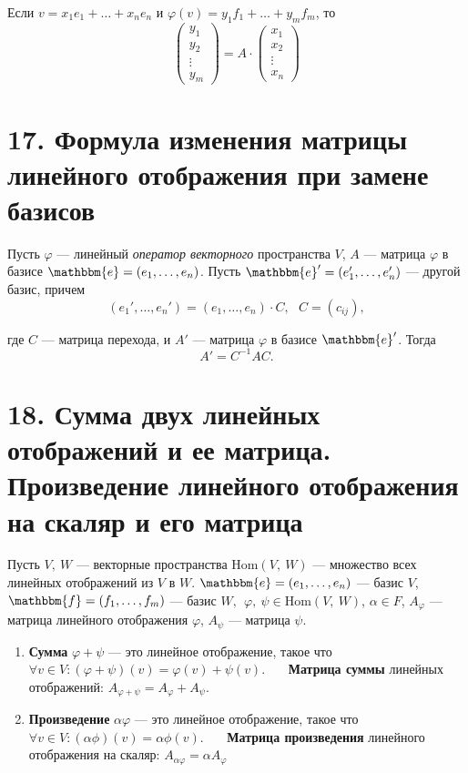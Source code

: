 \documentclass[a4paper, 12pt]{article}
\newcommand{\me}{\mathbbm{e}}
\newcommand{\mf}{\mathbbm{f}}
\begin{document}
Если $v = x_1e_1 + \ldots + x_ne_n$ и $\varphi(v) = y_1f_1 + \ldots + y_mf_m$, то
\[
\begin{pmatrix}
y_1 \\
y_2 \\
\vdots \\
y_m
\end{pmatrix} = 
A \cdot
\begin{pmatrix}
x_1 \\
x_2 \\
\vdots \\
x_n
\end{pmatrix}
\]

\section*{17. Формула изменения матрицы линейного отображения при замене базисов}
Пусть $\varphi$ --- линейный \textit{оператор векторного} пространства $V$, $A$ --- матрица $\varphi$ в базисе $\me = (e_1, \ldots, e_n)$. Пусть $\me' =(e_1', \ldots, e_n')$ --- другой базис, причем
\[
(e_1', \ldots, e_n') = (e_1, \ldots, e_n) \cdot C,\ \ \ C = (c_{ij}),
\]

где $C$ --- матрица перехода, и $A'$ --- матрица $\varphi$ в базисе $\me'$. Тогда
\[
A' = C^{-1}AC.
\]

\section*{18. Сумма двух линейных отображений и ее матрица. Произведение линейного отображения на скаляр и его матрица}
Пусть $V,\ W$ --- векторные пространства $\text{Hom}(V,\ W)$ --- множество всех линейных отображений из $V$ в $W$. $\me = (e_1, \ldots, e_n)$ --- базис $V$, $\mf = (f_1, \ldots, f_m)$ --- базис $W,\ \ \varphi,\ \psi \in \text{Hom}(V,\ W)$, $\alpha \in F$, $A_\varphi$ --- матрица линейного отображения $\varphi$, $A_\psi$ --- матрица $\psi$.

\begin{enumerate}
    \itemsep=0em
    \item \textbf{Сумма} $\varphi + \psi$ --- это линейное отображение, такое что $\forall v \in V: (\varphi + \psi)(v) = \varphi(v) + \psi(v).$
    \ \ \ \textbf{Матрица суммы} линейных отображений: $A_{\varphi + \psi} = A_\varphi + A_\psi.$
    \item \textbf{Произведение} $\alpha \varphi$ --- это линейное отображение, такое что $\forall v \in V: (\alpha \phi)(v) = \alpha \phi(v).$
    \ \ \ \textbf{Матрица произведения} линейного отображения на скаляр: $A_{\alpha \varphi} = \alpha A_\varphi$
\end{enumerate}
\end{document}
